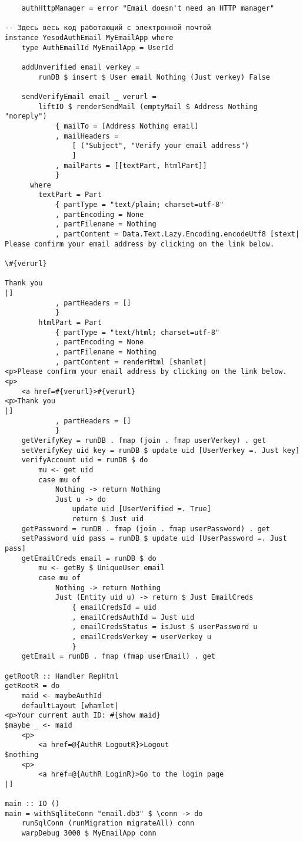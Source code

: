 \begin{lstlisting}
    authHttpManager = error "Email doesn't need an HTTP manager"

-- Здесь весь код работающий с электронной почтой
instance YesodAuthEmail MyEmailApp where
    type AuthEmailId MyEmailApp = UserId

    addUnverified email verkey =
        runDB $ insert $ User email Nothing (Just verkey) False

    sendVerifyEmail email _ verurl =
        liftIO $ renderSendMail (emptyMail $ Address Nothing "noreply")
            { mailTo = [Address Nothing email]
            , mailHeaders =
                [ ("Subject", "Verify your email address")
                ]
            , mailParts = [[textPart, htmlPart]]
            }
      where
        textPart = Part
            { partType = "text/plain; charset=utf-8"
            , partEncoding = None
            , partFilename = Nothing
            , partContent = Data.Text.Lazy.Encoding.encodeUtf8 [stext|
Please confirm your email address by clicking on the link below.

\#{verurl}

Thank you
|]
            , partHeaders = []
            }
        htmlPart = Part
            { partType = "text/html; charset=utf-8"
            , partEncoding = None
            , partFilename = Nothing
            , partContent = renderHtml [shamlet|
<p>Please confirm your email address by clicking on the link below.
<p>
    <a href=#{verurl}>#{verurl}
<p>Thank you
|]
            , partHeaders = []
            }
    getVerifyKey = runDB . fmap (join . fmap userVerkey) . get
    setVerifyKey uid key = runDB $ update uid [UserVerkey =. Just key]
    verifyAccount uid = runDB $ do
        mu <- get uid
        case mu of
            Nothing -> return Nothing
            Just u -> do
                update uid [UserVerified =. True]
                return $ Just uid
    getPassword = runDB . fmap (join . fmap userPassword) . get
    setPassword uid pass = runDB $ update uid [UserPassword =. Just pass]
    getEmailCreds email = runDB $ do
        mu <- getBy $ UniqueUser email
        case mu of
            Nothing -> return Nothing
            Just (Entity uid u) -> return $ Just EmailCreds
                { emailCredsId = uid
                , emailCredsAuthId = Just uid
                , emailCredsStatus = isJust $ userPassword u
                , emailCredsVerkey = userVerkey u
                }
    getEmail = runDB . fmap (fmap userEmail) . get

getRootR :: Handler RepHtml
getRootR = do
    maid <- maybeAuthId
    defaultLayout [whamlet|
<p>Your current auth ID: #{show maid}
$maybe _ <- maid
    <p>
        <a href=@{AuthR LogoutR}>Logout
$nothing
    <p>
        <a href=@{AuthR LoginR}>Go to the login page
|]

main :: IO ()
main = withSqliteConn "email.db3" $ \conn -> do
    runSqlConn (runMigration migrateAll) conn
    warpDebug 3000 $ MyEmailApp conn
\end{lstlisting}

